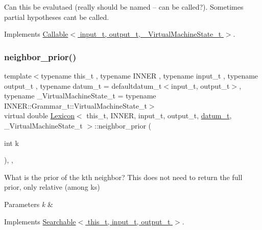 Can this be evalutaed (really should be named -- can be called?). Sometimes partial hypotheses can\textquotesingle{}t be called. 



Implements \hyperlink{class_callable_ac05ae8491f3b90986b1ad016da412afa}{Callable$<$ input\+\_\+t, output\+\_\+t, \+\_\+\+Virtual\+Machine\+State\+\_\+t $>$}.

\mbox{\label{class_lexicon_ac4cb2e1a2db91e0aa8984aa5aaad70a9}} 
\subsubsection{\texorpdfstring{neighbor\+\_\+prior()}{neighbor\_prior()}}
{\footnotesize\ttfamily template$<$typename this\+\_\+t , typename I\+N\+N\+ER , typename input\+\_\+t , typename output\+\_\+t , typename datum\+\_\+t  = defaultdatum\+\_\+t$<$input\+\_\+t, output\+\_\+t$>$, typename \+\_\+\+Virtual\+Machine\+State\+\_\+t  = typename I\+N\+N\+E\+R\+::\+Grammar\+\_\+t\+::\+Virtual\+Machine\+State\+\_\+t$>$ \\
virtual double \hyperlink{class_lexicon}{Lexicon}$<$ this\+\_\+t, I\+N\+N\+ER, input\+\_\+t, output\+\_\+t, \hyperlink{class_bayesable_a9f1a6c0cd7855550fa10b1a8f13a5867}{datum\+\_\+t}, \+\_\+\+Virtual\+Machine\+State\+\_\+t $>$\+::neighbor\+\_\+prior (\begin{DoxyParamCaption}\item[{int}]{k }\end{DoxyParamCaption})\hspace{0.3cm}{\ttfamily [inline]}, {\ttfamily [override]}, {\ttfamily [virtual]}}



What is the prior of the k\textquotesingle{}th neighbor? This does not need to return the full prior, only relative (among ks) 


\begin{DoxyParams}{Parameters}
{\em k} & \\
\hline
\end{DoxyParams}


Implements \hyperlink{class_searchable_aa6f72073717a4df0d22c73705555b13a}{Searchable$<$ this\+\_\+t, input\+\_\+t, output\+\_\+t $>$}.

\mbox{\label{class_lexicon_ae6f2b66da71145d0e8983951513b994c}} 
